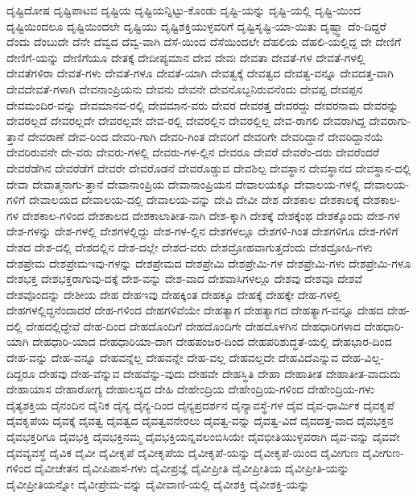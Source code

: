 {ದೃಷ್ಟಿದೋಷ
ದೃಷ್ಟಿಪಾಟವ
ದೃಷ್ಟಿಯ
ದೃಷ್ಟಿಯನ್ನಿಟ್ಟು-ಕೊಂಡು
ದೃಷ್ಟಿ-ಯನ್ನು
ದೃಷ್ಟಿ-ಯಲ್ಲಿ
ದೃಷ್ಟಿ-ಯಿಂದ
ದೃಷ್ಟಿಯಿಂದಲೂ
ದೃಷ್ಟಿಯಿಂದಲೇ
ದೃಷ್ಟಿಯು
ದೃಷ್ಟಿಶಕ್ತಿಯುಳ್ಳವರಿಗೆ
ದೃಷ್ಟಿಸೃಷ್ಟಿ-ಯಾ-ಯಿತು
ದೃಷ್ಟ್ವಾ
ದೆಂ-ದಿದ್ದರೆ
ದೆಂದು
ದೆಂಬುದೇ
ದೆನೇ
ದೆವ್ವದ
ದೆವ್ವ-ವಾಗಿ
ದೆಸೆ-ಯಿಂದ
ದೆಸೆಯಿಂದಲೇ
ದೆಹಲಿಯ
ದೆಹಲಿ-ಯಲ್ಲಿದ್ದ
ದೇ
ದೇಣಿಗೆ
ದೇಣಿಗೆ-ಯನ್ನು
ದೇಣಿಗೆಯೂ
ದೇತಕ್ಕೆ
ದೇದೀಪ್ಯಮಾನ
ದೇವ
ದೇವಃ
ದೇವತಾ
ದೇವತೆ-ಗಳ
ದೇವತೆ-ಗಳಲ್ಲಿ
ದೇವತೆಗಳಿರಾ
ದೇವತೆ-ಗಳು
ದೇವತೆ-ಗಳೂ
ದೇವತೆ-ಯಾಗಿ
ದೇವತ್ವಕ್ಕೆ
ದೇವತ್ವದ
ದೇವತ್ವ-ವನ್ನೂ
ದೇವದತ್ತ-ವಾಗಿ
ದೇವದೇವತೆ-ಗಳಾಗಿ
ದೇವನಾಂಪ್ರಿಯನು
ದೇವನು
ದೇವನೇ
ದೇವನೊಬ್ಬನಿರುವನೆಂದು
ದೇವಪ್ಪ
ದೇವಪ್ಪನ
ದೇವಮಂದಿರ-ವನ್ನು
ದೇವಮಾನವ-ರಲ್ಲಿ
ದೇವಮಾನ-ವರು
ದೇವರ
ದೇವರತ್ತ
ದೇವರದ್ದು
ದೇವರನಾಮ
ದೇವರನ್ನು
ದೇವರಲ್ಲದೆ
ದೇವರಲ್ಲದೇ
ದೇವರಲ್ಲವೇ
ದೇವ-ರಲ್ಲಿ
ದೇವರಲ್ಲಿನ
ದೇವರಲ್ಲಿಲ್ಲ
ದೇವ-ರಾಗಲಿ
ದೇವರಾಗಿದ್ದ
ದೇವರಾಗು-ತ್ತಾನೆ
ದೇವರಾಣೆ
ದೇವ-ರಿಂದ
ದೇವರಿ-ಗಾಗಿ
ದೇವರಿ-ಗಿಂತ
ದೇವರಿಗೆ
ದೇವರಿಗೇ
ದೇವರಿದ್ದಾನೆ
ದೇವರಿದ್ದಾನೆಯೆ
ದೇವರಿರುವನೇ
ದೇ-ವರು
ದೇವರು-ಗಳಲ್ಲಿ
ದೇವರು-ಗಳ-ಲ್ಲಿನ
ದೇವರೂ
ದೇವರೆ
ದೇವರೆಂ-ದರು
ದೇವರೆಂದರೆ
ದೇವರೆಡೆಗಿನ
ದೇವರೆಡೆಗೆ
ದೇವರೇ
ದೇವರೊಡನೆ
ದೇವರೊಡ್ಡುವ
ದೇವಶಿಲ್ಪ
ದೇವಸ್ಥಾನ
ದೇವಸ್ಥಾನದ
ದೇವಸ್ಥಾನ-ದಲ್ಲಿ
ದೇವಾ
ದೇವಾತ್ಮನಾಗು-ತ್ತಾನೆ
ದೇವಾನಾಂಪ್ರಿಯ
ದೇವಾನಾಂಪ್ರಿಯನ
ದೇವಾಲಯಕ್ಕೂ
ದೇವಾಲಯ-ಗಳಲ್ಲಿ
ದೇವಾಲಯ-ಗಳಿಗೆ
ದೇವಾಲಯದ
ದೇವಾಲಯ-ದಲ್ಲಿ
ದೇವಾಲಯ-ವನ್ನು
ದೇವಿ
ದೇವೀ
ದೇಶ
ದೇಶಕಾಲ
ದೇಶಕಾಲಕ್ಕೆ
ದೇಶಕಾಲ-ಗಳ
ದೇಶಕಾಲ-ಗಳಿಂದ
ದೇಶಕಾಲದ
ದೇಶಕಾಲಾತೀತ-ನಾಗಿ
ದೇಶ-ಕ್ಕಾಗಿ
ದೇಶಕ್ಕೆ
ದೇಶಕ್ಕೆಂಥ
ದೇಶಕ್ಕೊಂದು
ದೇಶ-ಗಳ
ದೇಶ-ಗಳನ್ನು
ದೇಶ-ಗಳಲ್ಲಿ
ದೇಶಗಳಲ್ಲಿದ್ದು
ದೇಶ-ಗಳ-ಲ್ಲಿನ
ದೇಶಗಳಲ್ಲೂ
ದೇಶಗಳಿ-ಗಿಂತ
ದೇಶಗಳಿಗೂ
ದೇಶ-ಗಳಿಗೆ
ದೇಶದ
ದೇಶ-ದಲ್ಲಿ
ದೇಶದಲ್ಲಿನ
ದೇಶ-ದಲ್ಲೇ
ದೇಶದ-ವರು
ದೇಶದ್ರೋಹವಾಗುತ್ತದೆಂದು
ದೇಶದ್ರೋಹಿ-ಗಳು
ದೇಶಪ್ರೇಮ
ದೇಶಪ್ರೇಮಇವು-ಗಳನ್ನು
ದೇಶಪ್ರೇಮದ
ದೇಶಪ್ರೇಮಿ
ದೇಶಪ್ರೇಮಿ-ಗಳ
ದೇಶಪ್ರೇಮಿ-ಗಳು
ದೇಶಪ್ರೇಮಿ-ಗಳೂ
ದೇಶಭಕ್ತ
ದೇಶಭಕ್ತರಾಗುವು-ದಕ್ಕೆ
ದೇಶ-ವನ್ನು
ದೇಶ-ವಾದ
ದೇಶವಾಸಿಗಳಲ್ಲೂ
ದೇಶವು
ದೇಶವೂ
ದೇಶವೆ
ದೇಶವೊಂದನ್ನು
ದೇಶೀಯ
ದೇಹ
ದೇಹಇವು
ದೇಹಕ್ಕಿಂತ
ದೇಹಕ್ಕೂ
ದೇಹಕ್ಕೆ
ದೇಹಕ್ಕೇ
ದೇಹ-ಗಳಲ್ಲಿ
ದೇಹಗಳಲ್ಲಿದ್ದನೆಂದಾದರೆ
ದೇಹ-ಗಳಿಂದ
ದೇಹಗಳಿವೆಯೇ
ದೇಹತ್ಯಾಗ
ದೇಹತ್ಯಾಗದ
ದೇಹತ್ಯಾಗ-ವನ್ನೂ
ದೇಹದ
ದೇಹ-ದಲ್ಲಿ
ದೇಹದಲ್ಲಿದ್ದೇವೆ
ದೇಹ-ದಿಂದ
ದೇಹದೊಂದಿಗೆ
ದೇಹದೊಂದಿಗೇ
ದೇಹದೊಳಗಿನ
ದೇಹಧಾರಿಗಳಾದ
ದೇಹಧಾರಿ-ಯಾಗಿ
ದೇಹಧಾರಿ-ಯಾದ
ದೇಹಧಾರಿಯಾ-ದಾಗ
ದೇಹಪಂಜರ-ದಿಂದ
ದೇಹಪರಿಶುದ್ಧತೆ-ಯಲ್ಲಿ
ದೇಹಭಾರ-ದಿಂದ
ದೇಹ-ವನ್ನು
ದೇಹ-ವನ್ನೂ
ದೇಹವನ್ನೆಲ್ಲ
ದೇಹವನ್ನೇ
ದೇಹ-ವಲ್ಲ
ದೇಹವಲ್ಲದೇ
ದೇಹವಿದೆಎನ್ನುವ
ದೇಹ-ವಿಲ್ಲ-ದಿದ್ದರೂ
ದೇಹವು
ದೇಹ-ವೆನ್ನುವ
ದೇಹವೆನ್ನು-ವುದು
ದೇಹವೇ
ದೇಹಸ್ಥಿತಿ
ದೇಹಾ
ದೇಹಾತೀತ
ದೇಹಾತೀತ-ವಾದುದು
ದೇಹಾಯಾಸ
ದೇಹಾರೋಗ್ಯ
ದೇಹಾಲಸ್ಯದ
ದೇಹಿ
ದೇಹೇಂದ್ರಿಯ
ದೇಹೇಂದ್ರಿಯ-ಗಳಿಂದ
ದೇಹೇಂದ್ರಿಯ-ಗಳು
ದೈತ್ಯಶಕ್ತಿಯ
ದೈನಂದಿನ
ದೈನಿಕ
ದೈನ್ಯ
ದೈನ್ಯ-ದಿಂದ
ದೈನ್ಯಪ್ರದರ್ಶನ
ದೈನ್ಯಾವಸ್ಥೆ-ಗಳ
ದೈವ
ದೈವ-ಧಾರ್ಮಿಕ
ದೈವಕೃಪೆ
ದೈವಕೃಪೆಯ
ದೈವಕ್ಕೆ
ದೈವತ್ವ
ದೈವತ್ವದ
ದೈವತ್ವವನೇರಲು
ದೈವತ್ವ-ವನ್ನು
ದೈವತ್ವ-ವಿದೆ
ದೈವದತ್ತ-ವಾದ
ದೈವಭಕ್ತನ
ದೈವಭಕ್ತರಿಗೂ
ದೈವಭಕ್ತಿ
ದೈವಭಕ್ತಿನಮ್ಮ
ದೈವಭಕ್ತಿಯನ್ನವಲಂಬಿಸಿಯೇ
ದೈವಭೀತಿಯುಳ್ಳವರಾಗಿ
ದೈವ-ವನ್ನು
ದೈವವೇ
ದೈವವ್ಯವಸ್ಥೆ
ದೈವಿಕ
ದೈವೀ
ದೈವೀಕೃಪೆ
ದೈವೀಕೃಪೆಯ
ದೈವೀಕೃಪೆ-ಯನ್ನು
ದೈವೀಕೃಪೆ-ಯಿಂದ
ದೈವೀಗುಣ
ದೈವೀಗುಣ-ಗಳಿಂದ
ದೈವೀಚೇತನ
ದೈವೀಪಿಪಾಸೆ-ಗಳು
ದೈವೀಪ್ರಜ್ಞೆ
ದೈವೀಪ್ರೀತಿ
ದೈವೀಪ್ರೀತಿಯ
ದೈವೀಪ್ರೀತಿ-ಯನ್ನು
ದೈವೀಪ್ರೀತಿಯನ್ನೋ
ದೈವೀಪ್ರೇಮ-ವನ್ನು
ದೈವೀವಾಣಿ-ಯಲ್ಲಿ
ದೈವೀಶಕ್ತಿ
ದೈವೀಶಕ್ತಿ-ಯನ್ನು
}
